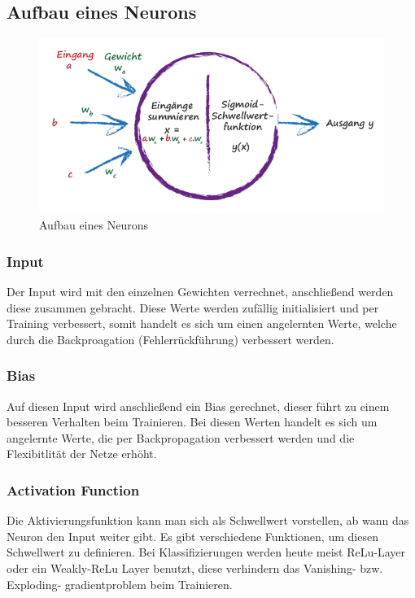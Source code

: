 \subsection{Aufbau eines Neurons}
\begin{figure}[htb]
  \centering  
  \includegraphics[scale=0.5]{img/S41_Buildyourown.png}
  \caption{Aufbau eines Neurons  \cite{rashid2017neuronale}}
  \label{fig:neuron}

\end{figure}
\subsubsection{Input}
Der Input wird mit den einzelnen Gewichten verrechnet, anschließend werden diese zusammen gebracht. Diese Werte werden zufällig initialisiert und per Training verbessert, somit handelt es sich um einen angelernten Werte, welche durch die Backproagation (Fehlerrückführung) verbessert werden.

\subsubsection{Bias}
Auf diesen Input wird anschließend ein Bias gerechnet, dieser führt zu einem besseren Verhalten beim Trainieren. Bei diesen Werten handelt es sich um angelernte Werte, die per Backpropagation verbessert werden und die Flexibitlität der Netze erhöht.


\subsubsection{Activation Function}
Die Aktivierungsfunktion kann man sich als Schwellwert vorstellen, ab wann das Neuron den Input weiter gibt. Es gibt verschiedene Funktionen, um diesen Schwellwert zu definieren. Bei Klassifizierungen werden heute meist ReLu-Layer oder ein Weakly-ReLu Layer benutzt, diese verhindern das Vanishing- bzw. Exploding- gradientproblem beim Trainieren.

